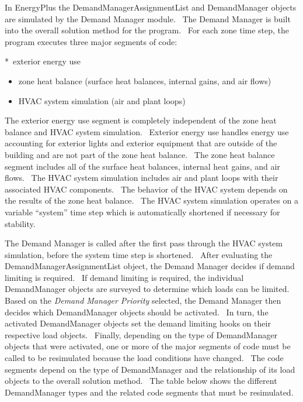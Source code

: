 In EnergyPlus the DemandManagerAssignmentList and DemandManager objects are simulated by the Demand Manager module.~ The Demand Manager is built into the overall solution method for the program.~ For each zone time step, the program executes three major segments of code:

*~exterior energy use

\begin{itemize}
\item
  zone heat balance (surface heat balances, internal gains, and air flows)
\item
  HVAC system simulation (air and plant loops)
\end{itemize}

The exterior energy use segment is completely independent of the zone heat balance and HVAC system simulation.~ Exterior energy use handles energy use accounting for exterior lights and exterior equipment that are outside of the building and are not part of the zone heat balance.~ The zone heat balance segment includes all of the surface heat balances, internal heat gains, and air flows.~ The HVAC system simulation includes air and plant loops with their associated HVAC components.~ The behavior of the HVAC system depends on the results of the zone heat balance.~ The HVAC system simulation operates on a variable ``system'' time step which is automatically shortened if necessary for stability.

The Demand Manager is called after the first pass through the HVAC system simulation, before the system time step is shortened.~ After evaluating the DemandManagerAssignmentList object, the Demand Manager decides if demand limiting is required.~ If demand limiting is required, the individual DemandManager objects are surveyed to determine which loads can be limited.~ Based on the \emph{Demand Manager Priority} selected, the Demand Manager then decides which DemandManager objects should be activated.~ In turn, the activated DemandManager objects set the demand limiting hooks on their respective load objects.~ Finally, depending on the type of DemandManager objects that were activated, one or more of the major segments of code must be called to be resimulated because the load conditions have changed.~ The code segments depend on the type of DemandManager and the relationship of its load objects to the overall solution method.~ The table below shows the different DemandManager types and the related code segments that must be resimulated.

